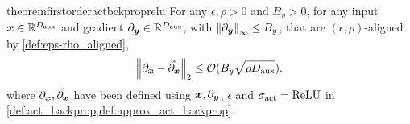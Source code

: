 

\begin{restatable}{theorem}{firstorderactbckproprelu}\label{thm:first_order_act_backprop_relu}
For any $\epsilon, \rho > 0$ and $B_y > 0$, for any input ${\bm{x}} \in \mathbb{R}^{D_{\text{aux}}}$ and gradient $\partial_{{\bm{y}}} \in \mathbb{R}^{D_{\text{aux}}}$, with $\left\|\partial_{{\bm{y}}}\right\|_{\infty} \le B_y$,  that are $(\epsilon, \rho)$-aligned by \cref{def:eps-rho_aligned}, 
\begin{align*}
    \left\| \partial_{ {\bm{x}} } - \Hat{ \partial_{ {\bm{x}} } } \right\|_{2} \le \mathcal{O}( B_y \sqrt{\rho D_{\text{aux}}} ).
\end{align*}
where $\partial_{ {\bm{x}} }, \Hat{ \partial_{ {\bm{x}} } }$ have been defined using ${\bm{x}}, \partial_{{\bm{y}}}$, $\epsilon$ and $\sigma_{\textrm{act}} = \mathrm{ReLU}$ in \cref{def:act_backprop,def:approx_act_backprop}.
\end{restatable}


